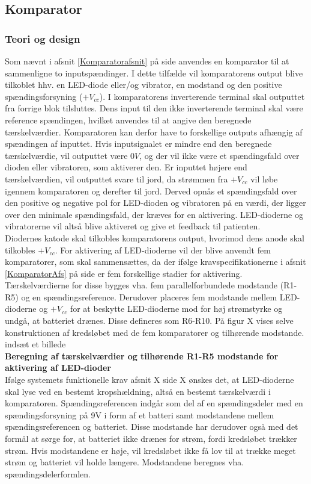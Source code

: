 \subsection{Komparator}
\subsubsection{Teori og design}
Som nævnt i afsnit \ref{Komparatorafsnit} på side \pageref{Komparatorafsnit} anvendes en komparator til at sammenligne to inputspændinger. I dette tilfælde vil komparatorens output blive tilkoblet hhv. en LED-diode eller/og vibrator, en modstand og den positive spændingsforsyning ($+V_{cc}$). I komparatorens inverterende terminal skal outputtet fra forrige blok tilsluttes. Dens input til den ikke inverterende terminal skal være reference spændingen, hvilket anvendes til at angive den beregnede tærskelværdier. Komparatoren kan derfor have to forskellige outputs afhængig af spændingen af inputtet. Hvis inputsignalet er mindre end den beregnede tærskelværdie, vil outputtet være $0V$, og der vil ikke være et spændingsfald over dioden eller vibratoren, som aktiverer den. Er inputtet højere end tærskelværdien, vil outputtet svare til jord, da strømmen fra $+V_{cc}$ vil løbe igennem komparatoren og derefter til jord. Derved opnås et spændingsfald over den positive og negative pol for LED-dioden og vibratoren på en værdi, der ligger over den minimale spændingsfald, der kræves for en aktivering. LED-dioderne og vibratorerne vil altså blive aktiveret og give et feedback til patienten. \\
Diodernes katode skal tilkobles komparatorens output, hvorimod dens anode skal tilkobles $+V_{cc}$. For aktivering af LED-dioderne vil der blive anvendt fem komparatorer, som skal sammensættes, da der ifølge kravspecifikationerne i afsnit \ref{KomparatorAfs} på side \pageref{KomparatorAfs} er fem forskellige stadier for aktivering. Tærskelværdierne for disse bygges vha. fem parallelforbundede modstande (R1-R5) og en spændingsreference. Derudover placeres fem modstande mellem LED-dioderne og $+V_{cc}$ for at beskytte LED-dioderne mod for høj strømstyrke og undgå, at batteriet drænes. Disse defineres som R6-R10. På figur X vises selve konstruktionen af kredsløbet med de fem komparatorer og tilhørende modstande. \\

indsæt et billede \\

\noindent\textbf{Beregning af tærskelværdier og tilhørende R1-R5 modstande for aktivering af LED-dioder} \\
Ifølge systemets funktionelle krav afsnit X side X ønskes det, at LED-dioderne skal lyse ved en bestemt kropshældning, altså en bestemt tærskelværdi i komparatoren. Spændingsreferencen indgår som del af en spændingsdeler med en spændingsforsyning på 9V i form af et batteri samt modstandene mellem spændingsreferencen og batteriet. Disse modstande har derudover også med det formål at sørge for, at batteriet ikke drænes for strøm, fordi kredsløbet trækker strøm. Hvis modstandene er høje, vil kredsløbet ikke få lov til at trække meget strøm og batteriet vil holde længere. Modstandene beregnes vha. spændingsdelerformlen. \\

